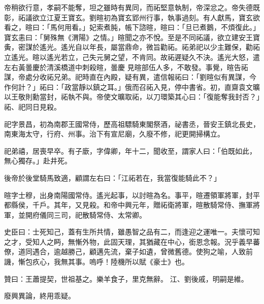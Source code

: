 \begin{pinyinscope}
 帝稍欲行意，孝嗣不能奪，坦之雖時有異同，而祏堅意執制，帝深忿之。帝失德既彰，祏議欲立江夏王寶玄。劉暄初為寶玄郢州行事，執事過刻。有人獻馬，寶玄欲看之，暄曰：「馬何用看。」妃索煮肫，帳下諮暄，暄曰：「旦已煮鵝，不煩復此。」寶玄恚曰：「舅殊無《渭陽》之情。」暄聞之亦不悅。至是不同祏議，欲立建安王寶夤，密謀於遙光。遙光自以年長，屬當鼎命，微旨勸祏。祏弟祀以少主難保，勸祏立遙光。暄以遙光若立，己失元舅之望，不肯同。故祏遲疑久不決。遙光大怒，遣左右黃曇慶於清溪橋道中刺殺暄，曇慶
 見暄部伍人多，不敢發。事覺，暄告祏謀，帝處分收祏兄弟。祀時直在內殿，疑有異，遣信報祏曰：「劉暄似有異謀，今作何計？」祏曰：「政當靜以鎮之耳。」俄而召祏入見，停中書省。初，直齋袁文曠以王敬則勳當封，祏執不與。帝使文曠取祏，以刀環築其心曰：「復能奪我封否？」祏、祀同日見殺。



 祀字景昌，初為南郡王國常侍，歷高祖驃騎東閣祭酒，祕書丞，晉安王鎮北長史，南東海太守，行府、州事。治下有宣尼廟，久廢不修，祀更開掃構立。



 祀弟禧，居喪早卒。有子廞，字偉卿，年十二，聞收至，謂家人曰：「伯既如此，無心獨存。」赴井死。



 後帝於後堂騎馬致適，顧謂左右曰：「江祏若在，我當復能騎此不？」



 暄字士穆，出身南陽國常侍。遙光起事，以討暄為名。事平，暄遷領軍將軍，封平都縣侯，千戶。其年，又見殺。和帝中興元年，贈祏衛將軍，暄散騎常侍、撫軍將軍，並開府儀同三司，祀散騎常侍、太常卿。



 史臣曰：士死知己，蓋有生所共情，雖愚智之品有二，而逢迎之運唯一。夫懷可知之才，受知人之眄，無慚外物，此固天理，其猶藏在中心，銜恩念報。況乎義早蕃僚，道同遇合，逾越勝己，顧邁先流，棄子如遺，曾微舊德。使狗之喻，人致前譏，慚包疚心，我無其事。嗚呼！陸機所以賦《豪士》也。



 贊曰：王蕭提契，世祖基之。樂羊食子，里克無辭。
 江、劉後戚，明嗣是維。



 廢興異論，終用乖疑。



\end{pinyinscope}